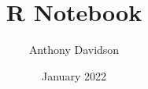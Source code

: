 \title{R Notebook}
\author{Anthony Davidson}
\date{January 2022}


\makeatletter
\def\maxwidth{ %
  \ifdim\Gin@nat@width>\linewidth
    \linewidth
  \else
    \Gin@nat@width
  \fi
}
\makeatother

\newlength{\csllabelwidth}
\setlength{\csllabelwidth}{3em}
\newlength{\cslhangindent}
\setlength{\cslhangindent}{1.5em}
\newenvironment{cslreferences}%
  {}%
  {\par}
\newenvironment{CSLReferences}[2] %
 {%
  \setlength{\parindent}{0pt}
  \ifodd #1 \everypar{\setlength{\hangindent}{\cslhangindent}}\ignorespaces\fi
  \ifnum #2 > 0
  \setlength{\parskip}{#2\baselineskip}
  \fi
 }%
 {}
\usepackage{calc} %
\newcommand{\CSLBlock}[1]{#1\hfill\break}
\newcommand{\CSLLeftMargin}[1]{\parbox[t]{\csllabelwidth}{#1}}
\newcommand{\CSLRightInline}[1]{\parbox[t]{\linewidth - \csllabelwidth}{#1}}
\newcommand{\CSLIndent}[1]{\hspace{\cslhangindent}#1}

\renewcommand{\contentsname}{Table of Contents}

\setlength{\parskip}{0pt}


\providecommand{\tightlist}{%
  \setlength{\itemsep}{0pt}\setlength{\parskip}{0pt}}

